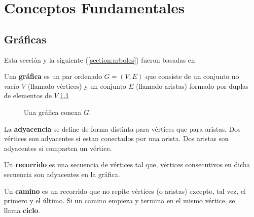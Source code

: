 \chapter{Conceptos Fundamentales} 

\section{Gr\'aficas}

Esta secci\'on y la siguiente (\ref{section:arboles}) fueron basadas en \cite{open}

\begin{definition}[Gr\'afica]
Una \textbf{gr\'afica} es un par ordenado $G=(V, E)$ que consiste de un conjunto no vac\'io $V$ (llamado v\'ertices) y un conjunto $E$ (llamado aristas) formado por duplas de elementos de $V$.\ref{fig:graph}
\end{definition}

\begin{figure}
\centering
  \caption{Una gr\'afica conexa $G$.}\label{fig:graph}
\end{figure}

\begin{definition}[Adyacencia]
La \textbf{adyacencia} se define de forma distinta para v\'ertices que para aristas. Dos v\'ertices son adyacentes si estan conectados por una arista. Dos aristas son adyacentes si comparten un v\'ertice.
\end{definition}

\begin{definition}[Recorrido]
Un \textbf{recorrido} es una secuencia de v\'ertices tal que, v\'ertices consecutivos en dicha secuencia son adyacentes en la gr\'afica.
\end{definition}

\begin{definition}[Camino]
Un \textbf{camino} es un recorrido que no repite v\'ertices (o aristas) excepto, tal vez, el primero y el \'ultimo. Si un camino empieza y termina en el mismo v\'ertice, se llama \textbf{ciclo}.
\end{definition}

